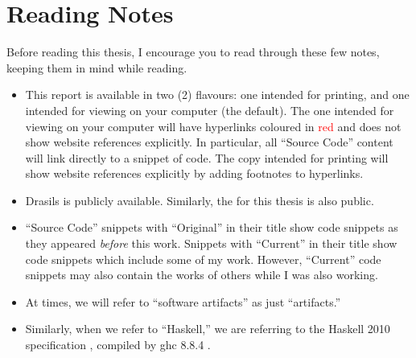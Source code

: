 \chapter{Reading Notes}
\label{chap:reading_notes}

Before reading this thesis, I encourage you to read through these few notes,
keeping them in mind while reading.

\begin{itemize}

      \item This report is available in two (2) flavours: one intended for
            printing, and one intended for viewing on your computer (the
            default). The one intended for viewing on your computer will have
            hyperlinks coloured in \textcolor{red}{red} and does not show
            website references explicitly. In particular, all ``Source Code''
            content will link directly to a snippet of code. The copy intended
            for printing will show website references explicitly by adding
            footnotes to hyperlinks.

      \item Drasils  is publicly
                  available. Similarly, the 
                  for this thesis is also public.

      \item ``Source Code'' snippets with ``Original'' in their title show code
            snippets as they appeared \textit{before} this work. Snippets with
            ``Current'' in their title show code snippets which include some of
            my work. However, ``Current'' code snippets may also contain the
            works of others while I was also working.

            \sourceCodeBlobHashesTable{}

      \item At times, we will refer to ``software artifacts'' as just
            ``artifacts.''

      \item Similarly, when we refer to ``Haskell,'' we are referring to the
            Haskell 2010 specification \cite{Haskell2010}, compiled by \acs{ghc}
            8.8.4 \cite{GHC884}.

\end{itemize}
